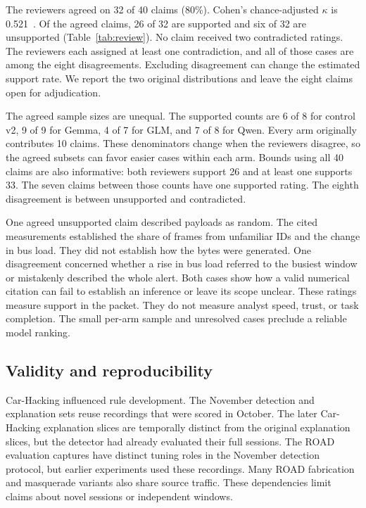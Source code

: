 \documentclass[sigconf,pbalance=true]{acmart}
\begin{document}
The reviewers agreed on 32 of 40 claims (80\%). Cohen's chance-adjusted $\kappa$ is 0.521~\cite{cohen1960agreement}. Of the agreed claims, 26 of 32 are supported and six of 32 are unsupported (Table~\ref{tab:review}). No claim received two contradicted ratings. The reviewers each assigned at least one contradiction, and all of those cases are among the eight disagreements. Excluding disagreement can change the estimated support rate. We report the two original distributions and leave the eight claims open for adjudication.

The agreed sample sizes are unequal. The supported counts are 6 of 8 for control v2, 9 of 9 for Gemma, 4 of 7 for GLM, and 7 of 8 for Qwen. Every arm originally contributes 10 claims. These denominators change when the reviewers disagree, so the agreed subsets can favor easier cases within each arm. Bounds using all 40 claims are also informative: both reviewers support 26 and at least one supports 33. The seven claims between those counts have one supported rating. The eighth disagreement is between unsupported and contradicted.

One agreed unsupported claim described payloads as random. The cited measurements established the share of frames from unfamiliar IDs and the change in bus load. They did not establish how the bytes were generated. One disagreement concerned whether a rise in bus load referred to the busiest window or mistakenly described the whole alert. Both cases show how a valid numerical citation can fail to establish an inference or leave its scope unclear. These ratings measure support in the packet. They do not measure analyst speed, trust, or task completion. The small per-arm sample and unresolved cases preclude a reliable model ranking.

\subsection{Validity and reproducibility}

Car-Hacking influenced rule development. The November detection and explanation sets reuse recordings that were scored in October. The later Car-Hacking explanation slices are temporally distinct from the original explanation slices, but the detector had already evaluated their full sessions. The ROAD evaluation captures have distinct tuning roles in the November detection protocol, but earlier experiments used these recordings. Many ROAD fabrication and masquerade variants also share source traffic. These dependencies limit claims about novel sessions or independent windows.
\end{document}
